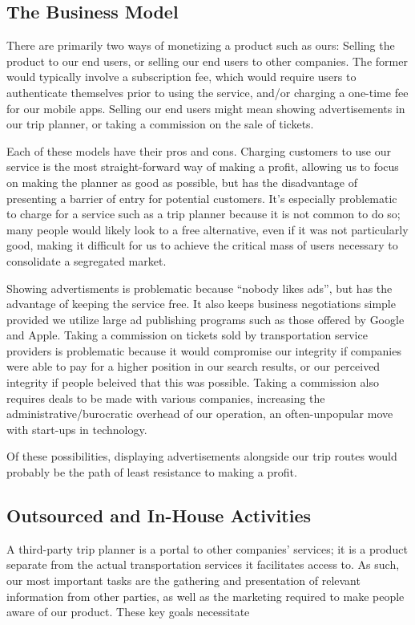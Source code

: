 \subsection{The Business Model}

There are primarily two ways of monetizing a product such as ours: Selling the
product to our end users, or selling our end users to other companies. The
former would typically involve a subscription fee, which would require users
to authenticate themselves prior to using the service, and/or charging a
one-time fee for our mobile apps. Selling our end users might mean showing
advertisements in our trip planner, or taking a commission on the sale of
tickets.

Each of these models have their pros and cons. Charging customers to use our
service is the most straight-forward way of making a profit, allowing us to
focus on making the planner as good as possible, but has the disadvantage
of presenting a barrier of entry for potential customers. It's especially
problematic to charge for a service such as a trip planner because it is
not common to do so; many people would likely look to a free alternative,
even if it was not particularly good, making it difficult for us to achieve
the critical mass of users necessary to consolidate a segregated market.

Showing advertisments is problematic because ``nobody likes ads'', but has the
advantage of keeping the service free. It also keeps business negotiations
simple provided we utilize large ad publishing programs such as those offered
by Google and Apple. Taking a commission on tickets sold by transportation
service providers is problematic because it would compromise our integrity if
companies were able to pay for a higher position in our search results, or
our perceived integrity if people beleived that this was possible. Taking a
commission also requires deals to be made with various companies, increasing
the administrative/burocratic overhead of our operation, an often-unpopular
move with start-ups in technology.

Of these possibilities, displaying advertisements alongside our trip routes
would probably be the path of least resistance to making a profit.

\subsection{Outsourced and In-House Activities}

A third-party trip planner is a portal to other companies' services; it is a
product separate from the actual transportation services it facilitates access
to. As such, our most important tasks are the gathering and presentation of
relevant information from other parties, as well as the marketing required to
make people aware of our product. These key goals necessitate

